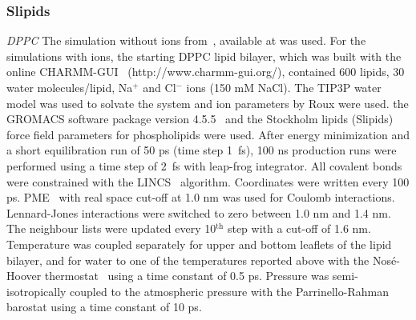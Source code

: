\documentclass[pre,aps,floatfix,authordate1-4,twocolumn]{revtex4-1}
\begin{document}
\subsubsection{Slipids}
{\it DPPC} The simulation without ions from~\cite{botan15}, available at \cite{slipidsFILES} was used. 
For the simulations with ions, the starting DPPC lipid bilayer, which was built with the online CHARMM-GUI~\cite{lee15}
(http://www.charmm-gui.org/), contained 600 lipids, 30 water molecules/lipid, Na$^+$ and Cl$^-$ ions (150 mM NaCl). 
The TIP3P water model was used to solvate the system and ion parameters by Roux \cite{beglov94,roux96} were used. 
the GROMACS software  package version 4.5.5~\cite{pronk13} and the Stockholm lipids (Slipids) force field parameters 
for phospholipids were used. After energy 
minimization and a short equilibration run of 50 ps (time step 1~fs), 100 ns production runs were performed using 
a time step of 2~fs with leap-frog integrator. All covalent bonds were constrained with the LINCS~\cite{hess97,hess07}
algorithm. Coordinates were written every 100 ps. PME~\cite{darden93,essman95} with real space cut-off at 1.0 nm was used for Coulomb 
interactions. Lennard-Jones interactions were switched to zero between 1.0 nm and 1.4 nm. The neighbour 
lists were updated every 10$^\mathrm{th}$ step with a cut-off of 1.6 nm. Temperature was coupled separately for upper and 
bottom leaflets of the lipid bilayer, and for water to one of the temperatures reported above with the Nos\'e-Hoover 
thermostat~\cite{nose84,hoover85} using a time constant of 0.5 ps. Pressure was semi-isotropically coupled to the atmospheric pressure 
with the Parrinello-Rahman~\cite{parrinello81} barostat using a time constant of 10 ps.
\end{document}
